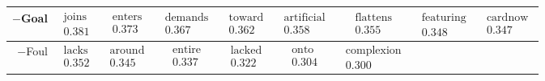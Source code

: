 \documentclass[10pt, a4paper]{UUThesisTemplate}
\begin{document}
\begin{table}
\scriptsize
\hspace{-1.5cm}
\begin{tabular}{r|c c c c c c c c}
$-$Goal
& $ \begin{matrix} \text{joins} \\ 0.381 \end{matrix}$
& $ \begin{matrix} \text{enters} \\ 0.373 \end{matrix}$
& $ \begin{matrix} \text{demands} \\ 0.367 \end{matrix}$
& $ \begin{matrix} \text{toward} \\ 0.362 \end{matrix}$
& $ \begin{matrix} \text{artificial} \\ 0.358 \end{matrix}$
& $ \begin{matrix} \text{flattens} \\ 0.355 \end{matrix}$
& $ \begin{matrix} \text{featuring} \\ 0.348 \end{matrix}$
& $ \begin{matrix} \text{cardnow} \\ 0.347 \end{matrix}$
\\\hline
$-$Foul
& $ \begin{matrix} \text{lacks} \\ 0.352 \end{matrix}$
& $ \begin{matrix} \text{around} \\ 0.345 \end{matrix}$
& $ \begin{matrix} \text{entire} \\ 0.337 \end{matrix}$
& $ \begin{matrix} \text{lacked} \\ 0.322 \end{matrix}$
& $ \begin{matrix} \text{onto} \\ 0.304 \end{matrix}$
& $ \begin{matrix} \text{complexion} \\ 0.300 \end{matrix}$

\end{tabular}
\end{table}
\end{document}
